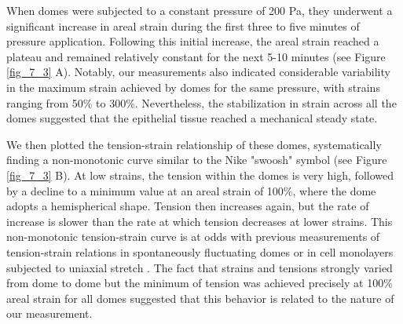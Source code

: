 When domes were subjected to a constant pressure of 200 \unit{\pascal}, they underwent a significant increase in areal strain during the first three to five minutes of pressure application. Following this initial increase, the areal strain reached a plateau and remained relatively constant for the next 5-10 minutes (see Figure \ref{fig_7_3} A). Notably, our measurements also indicated considerable variability in the maximum strain achieved by domes for the same pressure, with strains ranging from 50\% to 300\%. Nevertheless, the stabilization in strain across all the domes suggested that the epithelial tissue reached a mechanical steady state.

We then plotted the tension-strain relationship of these domes, systematically finding a non-monotonic curve similar to the Nike "swoosh" symbol (see Figure \ref{fig_7_3} B). At low strains, the tension within the domes is very high, followed by a decline to a minimum value at an areal strain of 100\%, where the dome adopts a hemispherical shape. Tension then increases  again, but the rate of increase is slower than the rate at which tension decreases at lower strains. This non-monotonic tension-strain curve is at odds with previous measurements of tension-strain relations in spontaneously fluctuating domes \cite{latorre2018,marin-llaurado2022} or in cell monolayers subjected to uniaxial stretch \cite{duque2023}. The fact that strains and tensions strongly varied from dome to dome but the minimum of tension was achieved precisely at 100\% areal strain for all domes suggested that this behavior is related to the nature of our measurement. 

